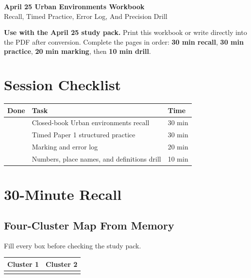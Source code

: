 \documentclass[11pt,a4paper]{article}
\newcommand{\term}[1]{\textcolor{HeadingBlue}{\textbf{#1}}}
\newcommand{\todobox}{\fbox{\rule{0pt}{0.8em}\rule{0.8em}{0pt}}}
\begin{document}
\begin{center}
{\sffamily\bfseries\color{HeadingBlue}\LARGE April 25 Urban Environments Workbook}\\[0.25em]
{\sffamily\color{AccentTeal}\large Recall, Timed Practice, Error Log, And Precision Drill}
\end{center}

\noindent\colorbox{SoftBlue}{%
\begin{minipage}{0.965\textwidth}
\sffamily
\textbf{\textcolor{HeadingBlue}{Use with the April 25 study pack.}}
Print this workbook or write directly into the PDF after conversion. Complete
the pages in order: \term{30 min recall}, \term{30 min practice},
\term{20 min marking}, then \term{10 min drill}.
\end{minipage}
}

\section{Session Checklist}

\begin{tabularx}{\textwidth}{L{0.12\textwidth}Y L{0.18\textwidth}}
\toprule
\textbf{Done} & \textbf{Task} & \textbf{Time} \\
\midrule
\todobox & Closed-book Urban environments recall & 30 min \\
\todobox & Timed Paper 1 structured practice & 30 min \\
\todobox & Marking and error log & 20 min \\
\todobox & Numbers, place names, and definitions drill & 10 min \\
\bottomrule
\end{tabularx}

\section{30-Minute Recall}

\subsection{Four-Cluster Map From Memory}

Fill every box before checking the study pack.

\begin{tabularx}{\textwidth}{Y Y}
\toprule
\textbf{\textcolor{HeadingBlue}{Cluster 1}} &
\textbf{\textcolor{HeadingBlue}{Cluster 2}} \\
\midrule
\rule{0pt}{4.3cm} & \rule{0pt}{4.3cm} \\
\bottomrule
\end{tabularx}
\end{document}
